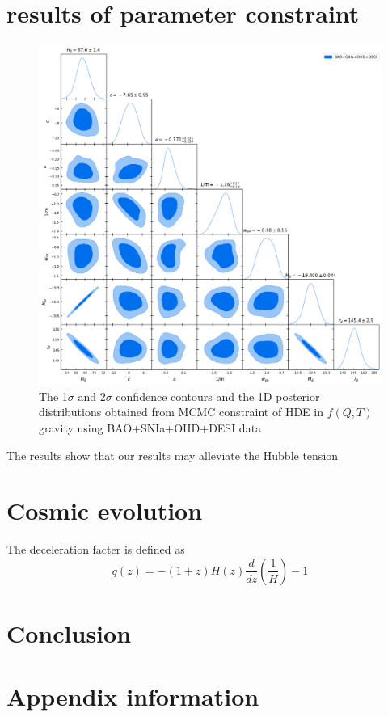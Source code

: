 \documentclass[preprint]{aastex631}
\begin{document}
\section{results of parameter constraint}
\begin{figure}
    \centering
    \includegraphics[width=1\linewidth]{./pic/parameter contraint.png}
    \caption{\label{fig:constraint} The 1$\sigma$ and 2$\sigma$ confidence contours and the 1D posterior distributions obtained from MCMC constraint of HDE in $f(Q,T)$ gravity using BAO+SNIa+OHD+DESI data}
\end{figure}
The results show that our results may alleviate the Hubble tension

\section{Cosmic evolution}
The deceleration facter is defined as
\begin{equation}
    q(z)=-(1+z)H(z)\frac{d}{dz}\left(\frac{1}{H}\right)-1 
\end{equation}

\section{Conclusion}
\appendix

\section{Appendix information}



{}

\end{document}
